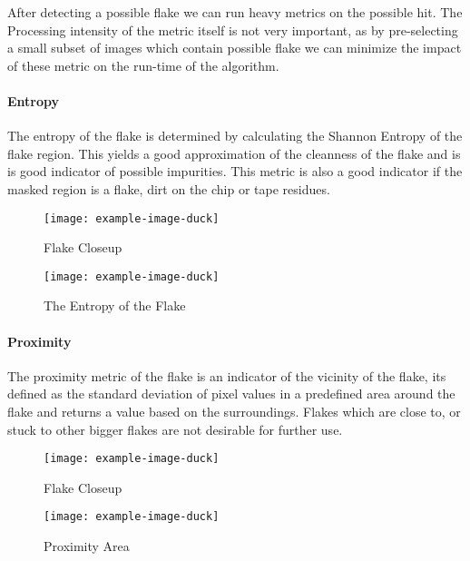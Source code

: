 After detecting a possible flake we can run heavy metrics on the possible hit. The Processing intensity of the metric itself is not very important, as by pre-selecting a small subset of images which contain possible flake we can minimize the impact of these metric on the run-time of the algorithm.
\paragraph{Entropy}
The entropy of the flake is determined by calculating the Shannon Entropy of the flake region. This yields a good approximation of the cleanness of the flake and is is good indicator of possible impurities. This metric is also a good indicator if the masked region is a flake, dirt on the chip or tape residues.\\
\begin{figure}[h!]
\centering
\begin{minipage}{.45\textwidth}
  \centering
  \texttt{[image: example-image-duck]}
  \caption{Flake Closeup}
\end{minipage}
\begin{minipage}{.45\textwidth}

  \centering
  \texttt{[image: example-image-duck]}
    \caption{The Entropy of the Flake}
\end{minipage}
\end{figure}

\paragraph{Proximity}
The proximity metric of the flake is an indicator of the vicinity of the flake, its defined as the standard deviation of pixel values in a predefined area around the flake and returns a value based on the surroundings. Flakes which are close to, or stuck to other bigger flakes are not desirable for further use.\\
\begin{figure}[h!]
\centering
\begin{minipage}{.45\textwidth}
  \centering
  \texttt{[image: example-image-duck]}
  \caption{Flake Closeup}
\end{minipage}
\begin{minipage}{.45\textwidth}

  \centering
  \texttt{[image: example-image-duck]}
    \caption{Proximity Area}
\end{minipage}
\end{figure}

